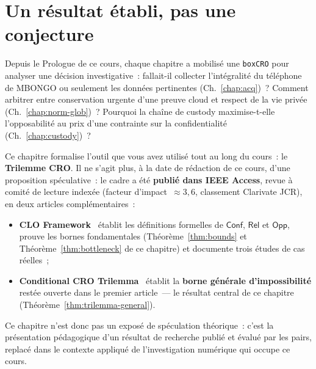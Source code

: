 \bigskip

\section*{Un résultat établi, pas une conjecture}

Depuis le Prologue de ce cours, chaque chapitre a mobilisé une
\texttt{boxCRO} pour analyser une décision investigative~: fallait-il
collecter l'intégralité du téléphone de MBONGO ou seulement les
données pertinentes (Ch.~\ref{chap:acq})~? Comment arbitrer entre
conservation urgente d'une preuve cloud et respect de la vie privée
(Ch.~\ref{chap:norm-glob})~? Pourquoi la chaîne de custody
maximise-t-elle l'opposabilité au prix d'une contrainte sur la
confidentialité (Ch.~\ref{chap:custody})~?

Ce chapitre formalise l'outil que vous avez utilisé tout au long
du cours~: le \textbf{Trilemme CRO}. Il ne s'agit plus, à la date
de rédaction de ce cours, d'une proposition spéculative~: le cadre
a été \textbf{publié dans IEEE Access}, revue à comité de lecture
indexée (facteur d'impact~$\approx 3{,}6$, classement Clarivate
JCR), en deux articles complémentaires~:

\begin{itemize}
    \item \textbf{CLO Framework}~\cite{minka2026clo} établit les
          définitions formelles de $\mathsf{Conf}$, $\mathsf{Rel}$
          et $\mathsf{Opp}$, prouve les bornes fondamentales
          (Théorème~\ref{thm:bounds} et Théorème~\ref{thm:bottleneck}
          de ce chapitre) et documente trois études de cas réelles~;
    \item \textbf{Conditional CRO Trilemma}~\cite{minka2026conditional}
          établit la \textbf{borne générale d'impossibilité} restée
          ouverte dans le premier article~--- le résultat central de
          ce chapitre (Théorème~\ref{thm:trilemma-general}).
\end{itemize}

Ce chapitre n'est donc pas un exposé de spéculation théorique~:
c'est la présentation pédagogique d'un résultat de recherche
publié et évalué par les pairs, replacé dans le contexte appliqué
de l'investigation numérique qui occupe ce cours.

\separateur

